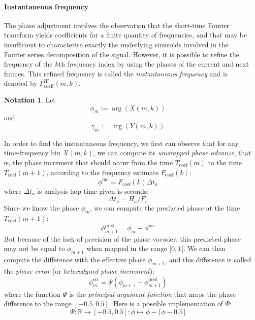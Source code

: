 \documentclass[letterpaper]{article}
\theoremstyle{definition}
\newtheorem*{notation}{Notation}
\theoremstyle{remark}
\begin{document}
\paragraph{Instantaneous frequency}
The phase adjustment involves the observation that the short-time Fourier
transform yields coefficients for a finite quantity of frequencies, and that may
be insufficient to characterise exactly the underlying sinusoids involved in the
Fourier series decomposition of the signal. However, it is possible to refine
the frequency of the \(k\)th frequency index by using the phases of the current
and next frames. This refined frequency is called the \emph{instantaneous
frequency} and is denoted by \(F_{\text{coeff}}^{\text{IF}}(m,k)\).
\begin{notation}
Let \[\phi_m:=\arg(X(m,k))\]
and \[\gamma_m:=\arg(Y(m,k))\]
\end{notation}
In order to find the instantaneous frequency, we first can observe that for any
time-frequency bin \(X(m,k)\), we can compute its \emph{unwrapped phase
advance}, that is, the phase increment that should occur from the time
\(T_{\text{coef}}(m)\) to the time \(T_{\text{coef}}(m+1)\), according to the
frequency estimate \(F_{\text{coef}}(k)\):
\begin{equation}
	\phi^{\text{inc}}=F_{\text{coef}}(k) \Delta t_a
\end{equation}
where \(\Delta t_a\) is analysis hop time given is seconds:
\begin{equation}
	\Delta t_a=H_a/F_s
\end{equation}
Since we know the phase \(\phi_m\), we can compute the predicted phase at
the time \(T_{\text{coef}}(m+1)\):
\begin{equation}
	\phi^{\text{pred}}_{m+1}=\phi_m + \phi^{\text{inc}}
\end{equation}
But because of the lack of precision of the phase vocoder, this predicted phase
may not be equal to \(\phi_{m+1}\) when mapped in the range \([0, 1[\).
We can then compute the difference with the effective phase \(\phi_{m+1}\), and
this difference is called the \emph{phase error} (or \emph{heterodyned phase
increment}):
\begin{equation}
	\phi^{\text{err}}_m=\Psi(\phi_{m+1} - \phi^{\text{pred}}_{m+1})
\end{equation}
where the function \(\Psi\) is the \emph{principal argument function} that maps
the phase difference to the range \([-0.5, 0.5]\).
Here is a possible implementation of \(\Psi\):
\begin{equation}
	\Psi:\mathbb{R}\to[-0.5,0.5]:\phi\mapsto \phi - \lceil \phi-0.5 \rceil
\end{equation}
\end{document}
